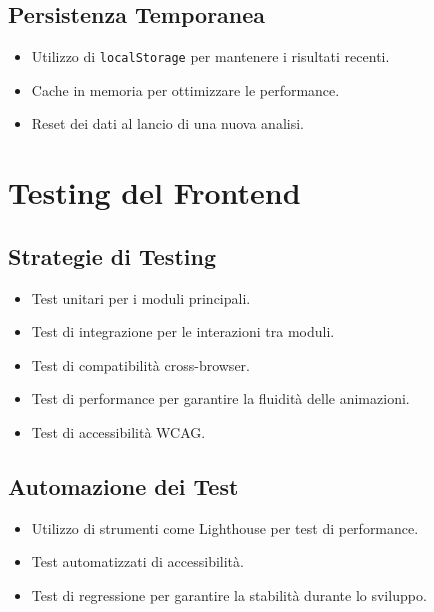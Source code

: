 \subsection{Persistenza Temporanea}
\begin{itemize}
    \item Utilizzo di \texttt{localStorage} per mantenere i risultati recenti.
    \item Cache in memoria per ottimizzare le performance.
    \item Reset dei dati al lancio di una nuova analisi.
\end{itemize}

\section{Testing del Frontend}

\subsection{Strategie di Testing}
\begin{itemize}
    \item Test unitari per i moduli principali.
    \item Test di integrazione per le interazioni tra moduli.
    \item Test di compatibilità cross-browser.
    \item Test di performance per garantire la fluidità delle animazioni.
    \item Test di accessibilità WCAG.
\end{itemize}

\subsection{Automazione dei Test}
\begin{itemize}
    \item Utilizzo di strumenti come Lighthouse per test di performance.
    \item Test automatizzati di accessibilità.
    \item Test di regressione per garantire la stabilità durante lo sviluppo.
\end{itemize}